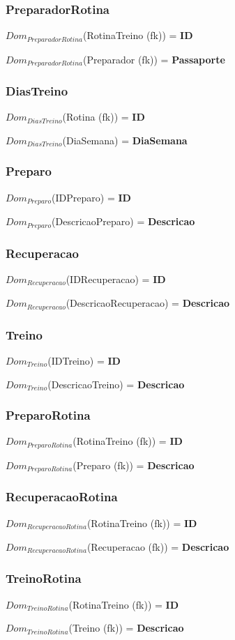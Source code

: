 \documentclass[12pt,a4paper]{article}
\newcommand{\createdomain}[3]{
    $Dom_{#1}$(#2) = {\bf #3}

}
\begin{document}
    \subsubsection{PreparadorRotina}
        \createdomain{PreparadorRotina}{RotinaTreino (fk)}{\bf ID}
        \createdomain{PreparadorRotina}{Preparador (fk)}{\bf Passaporte}

    \subsubsection{DiasTreino}
        \createdomain{DiasTreino}{Rotina (fk)}{\bf ID}
        \createdomain{DiasTreino}{DiaSemana}{\bf DiaSemana}

    \subsubsection{Preparo}
        \createdomain{Preparo}{IDPreparo}{\bf ID}
        \createdomain{Preparo}{DescricaoPreparo}{\bf Descricao}

    \subsubsection{Recuperacao}
        \createdomain{Recuperacao}{IDRecuperacao}{\bf ID}
        \createdomain{Recuperacao}{DescricaoRecuperacao}{\bf Descricao}

    \subsubsection{Treino}
        \createdomain{Treino}{IDTreino}{\bf ID}
        \createdomain{Treino}{DescricaoTreino}{\bf Descricao}

    \subsubsection{PreparoRotina}
        \createdomain{PreparoRotina}{RotinaTreino (fk)}{\bf ID}
        \createdomain{PreparoRotina}{Preparo (fk)}{\bf Descricao}

    \subsubsection{RecuperacaoRotina}
        \createdomain{RecuperacaoRotina}{RotinaTreino (fk)}{\bf ID}
        \createdomain{RecuperacaoRotina}{Recuperacao (fk)}{\bf Descricao}

    \subsubsection{TreinoRotina}
        \createdomain{TreinoRotina}{RotinaTreino (fk)}{\bf ID}
        \createdomain{TreinoRotina}{Treino (fk)}{\bf Descricao}
\end{document}
